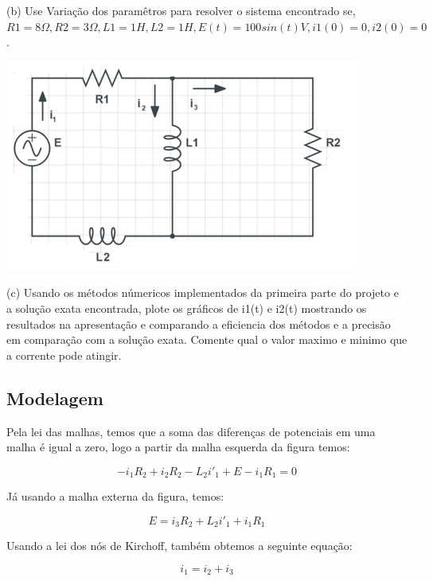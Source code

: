 \documentclass[12pt]{article}%
\begin{document}
    (b) Use Variação dos paramêtros para resolver o sistema encontrado se, \(R1 = 8 \Omega, R2 = 3 \Omega, L1 = 1H, L2 = 1 H, E(t) = 100 sin(t)V, i1(0) = 0, i2(0) = 0\).

    \begin{center}
        \includegraphics[scale=1.0]{problemas/p3b.png}
    \end{center}
    
    (c) Usando os métodos númericos implementados da primeira parte do projeto e a solução exata
encontrada, plote os gráficos de i1(t) e i2(t) mostrando os resultados na apresentação e comparando a
eficiencia dos métodos e a precisão em comparação com a solução exata. Comente qual o valor maximo
e minimo que a corrente pode atingir.

    \subsection{Modelagem}
    Pela lei das malhas, temos que a soma das diferenças de potenciais em uma malha é igual a zero, logo a partir da malha esquerda da figura temos:
    
    \begin{equation}
        -i_{1}R_{2} + i_{2}R_{2} - L_{2}i'_{1} + E - i_{1}R_{1} = 0
        \label{p3_eq34}
    \end{equation}
    
    Já usando a malha externa da figura, temos:
    
    \begin{equation}
        E = i_{3}R_{2} + L_{2}i'_{1} + i_{1}R_{1}
        \label{p3_eq35}
    \end{equation}
    
    Usando a lei dos nós de Kirchoff, também obtemos a seguinte equação:
    
    \begin{equation}
        i_{1} = i_{2} + i_{3}
        \label{p3_eq36}
    \end{equation}
    
\end{document}
